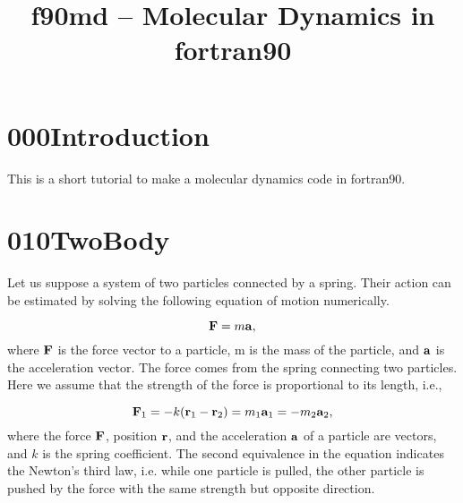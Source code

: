 \documentclass[a4,10pt]{article}
\title{f90md -- Molecular Dynamics in fortran90}
\begin{document}
\maketitle
\section{000Introduction}
This is a short tutorial to make a molecular dynamics code in fortran90.




\section{010TwoBody}
Let us suppose a system of two particles connected by a spring.
Their action can be estimated by solving the following equation of motion numerically.


\begin{equation}
  {\bf F} = m {\bf a},
\end{equation}
where ${\bf F}$ is the force vector to a particle, m is the mass of
the particle, and ${\bf a}$ is the acceleration vector.
The force comes from the spring connecting two particles.  Here we
assume that the strength of the force is proportional to its length, i.e., 

\begin{equation}\label{eq:f_sp}
{\bf F}_1 = -k ({\bf r}_1- {\bf r}_2) = m_1 {\bf a}_1=-m_2 {\bf a}_2,
\end{equation}
where the force $\bf F$, position $\bf r$, and the acceleration $\bf
a$ of a particle are vectors, and $k$ is the spring coefficient. 
The second equivalence in the equation indicates the Newton's third
law, i.e. while one particle is pulled, the other
particle is pushed by the force with the same strength but opposite direction.
\end{document}

